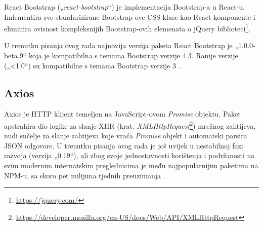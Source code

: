 \documentclass[times, utf8, diplomski, numeric]{fer}
\newcommand{\razmaks}{\vspace{10pt}}
\begin{document}
React Bootstrap („\emph{react-bootstrap}“) je implementacija Bootstrap-a u React-u.
Imlementira sve standarizirane Bootstrap-ove CSS klase kao React komponente i eliminira ovisnost kompleksnijih Bootstrap-ovih elemenata o jQuery biblioteci\footnote{\url{https://jquery.com/}}.

U trenutku pisanja ovog rada najnovija verzija paketa React Bootstrap je „1.0.0-beta.9“ koja je kompatibilna s temama Bootstrap verzije 4.3.
Ranije verzije („<1.0“) su kompatibilne s temama Bootstrap verzije 3 \citep{bs_react}.


\razmaks
\subsection{Axios}

Axios je HTTP klijent temeljen na JavaScript-ovom \emph{Promise} objektu.
Paket apstrahira dio logike za slanje XHR (krat. \emph{XMLHttpRequest}\footnote{\url{https://developer.mozilla.org/en-US/docs/Web/API/XMLHttpRequest}}) mrežnog zahtijeva, nudi sučelje za slanje zahtijeva koje vraća \emph{Promise} objekt i automatski parsira JSON odgovore.
U trenutku pisanja ovog rada je još uvijek u nestabilnoj fazi razvoja (verzija „0.19“), ali zbog svoje jednostavnosti korištenja i podržanosti na svim modernim internatskim preglednicima je među najpopularnijim paketima na NPM-u, sa skoro pet milijuna tjednih preuzimanja \citep{axios}.











\end{document}
